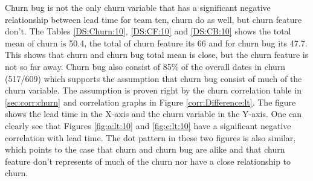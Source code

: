 \documentclass[UKenglish]{ifimaster}  %
\begin{document}
\newpage
Churn bug is not the only churn variable that has a significant negative relationship between lead time for team ten, churn do as well, but churn feature don't. The Tables \ref{DS:Churn:10}, \ref{DS:CF:10} and \ref{DS:CB:10} shows the total mean of churn is 50.4, the total of churn feature its 66 and for churn bug its 47.7. This shows that churn and churn bug total mean is close, but the churn feature is not so far away. Churn bug also consist of 85\% of the overall dates in churn (517/609) which supports the assumption that churn bug consist of much of the churn variable. The assumption is proven right by the churn correlation table in \ref{sec:corr:churn} and correlation graphs in Figure \ref{corr:Difference:lt}. The figure shows the lead time in the X-axis and the churn variable in the Y-axis. One can clearly see that Figures \ref{fig:a:lt:10} and \ref{fig:c:lt:10} have a significant negative correlation with lead time. The dot pattern in these two figures is also similar, which points to the case that churn and churn bug are alike and that churn feature don't represents of much of the churn nor have a close relationship to churn. 
\end{document}
